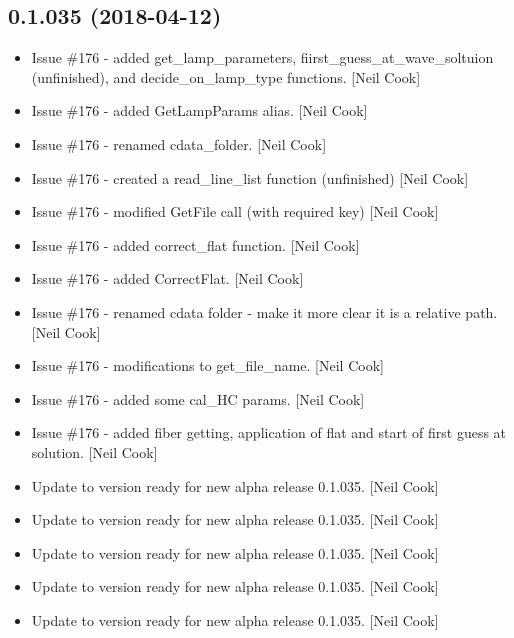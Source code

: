 \documentclass[a4paper,10pt,english]{report}
\begin{document}
\subsection{0.1.035 (2018-04-12)}
\label{\detokenize{misc/changelog:id462}}\begin{itemize}
\item {} 
Issue \#176 - added get\_lamp\_parameters, fiirst\_guess\_at\_wave\_soltuion
(unfinished), and decide\_on\_lamp\_type functions. {[}Neil Cook{]}

\item {} 
Issue \#176 - added GetLampParams alias. {[}Neil Cook{]}

\item {} 
Issue \#176 - renamed cdata\_folder. {[}Neil Cook{]}

\item {} 
Issue \#176 - created a read\_line\_list function (unfinished) {[}Neil
Cook{]}

\item {} 
Issue \#176 - modified GetFile call (with required key) {[}Neil Cook{]}

\item {} 
Issue \#176 - added correct\_flat function. {[}Neil Cook{]}

\item {} 
Issue \#176 - added CorrectFlat. {[}Neil Cook{]}

\item {} 
Issue \#176 - renamed cdata folder - make it more clear it is a
relative path. {[}Neil Cook{]}

\item {} 
Issue \#176 - modifications to get\_file\_name. {[}Neil Cook{]}

\item {} 
Issue \#176 - added some cal\_HC params. {[}Neil Cook{]}

\item {} 
Issue \#176 - added fiber getting, application of flat and start of
first guess at solution. {[}Neil Cook{]}

\item {} 
Update to version ready for new alpha release 0.1.035. {[}Neil Cook{]}

\item {} 
Update to version ready for new alpha release 0.1.035. {[}Neil Cook{]}

\item {} 
Update to version ready for new alpha release 0.1.035. {[}Neil Cook{]}

\item {} 
Update to version ready for new alpha release 0.1.035. {[}Neil Cook{]}

\item {} 
Update to version ready for new alpha release 0.1.035. {[}Neil Cook{]}

\end{itemize}
\end{document}
